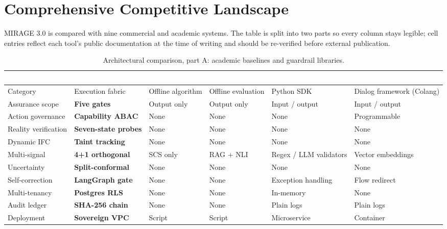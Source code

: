 \documentclass[11pt,a4paper]{article}
\newcommand{\hc}[1]{\textcolor{white}{\textbf{#1}}}
\newcommand{\hdrrow}{\rowcolor{primarynavy}}
\begin{document}
\section{Comprehensive Competitive Landscape}
MIRAGE 3.0 is compared with nine commercial and academic systems. The table is split into two parts so every column stays legible; cell entries reflect each tool's public documentation at the time of writing and should be re-verified before external publication.

\begin{table}[!htbp]
\centering\scriptsize
\renewcommand{\arraystretch}{1.25}
\begin{tabularx}{\linewidth}{@{}L{2.2cm} Y Y Y Y Y@{}}
\hdrrow \hc{Dimension} & \hc{MIRAGE 3.0} & \hc{SelfCheckGPT} & \hc{FActScore} & \hc{Guardrails AI} & \hc{NeMo Guardrails}\\
\toprule
Category & Execution fabric & Offline algorithm & Offline evaluation & Python SDK & Dialog framework (Colang)\\
Assurance scope & \textbf{Five gates} & Output only & Output only & Input / output & Input / output\\
Action governance & \textbf{Capability ABAC} & None & None & None & Programmable\\
Reality verification & \textbf{Seven-state probes} & None & None & None & None\\
Dynamic IFC & \textbf{Taint tracking} & None & None & None & None\\
Multi-signal & \textbf{4+1 orthogonal} & SCS only & RAG + NLI & Regex / LLM validators & Vector embeddings\\
Uncertainty & \textbf{Split-conformal} & None & None & None & None\\
Self-correction & \textbf{LangGraph gate} & None & None & Exception handling & Flow redirect\\
Multi-tenancy & \textbf{Postgres RLS} & None & None & In-memory & None\\
Audit ledger & \textbf{SHA-256 chain} & None & None & Plain logs & Plain logs\\
Deployment & \textbf{Sovereign VPC} & Script & Script & Microservice & Container\\
\bottomrule
\end{tabularx}
\caption{Architectural comparison, part A: academic baselines and guardrail libraries.}
\label{tab:competitors_a}
\end{table}
\end{document}
